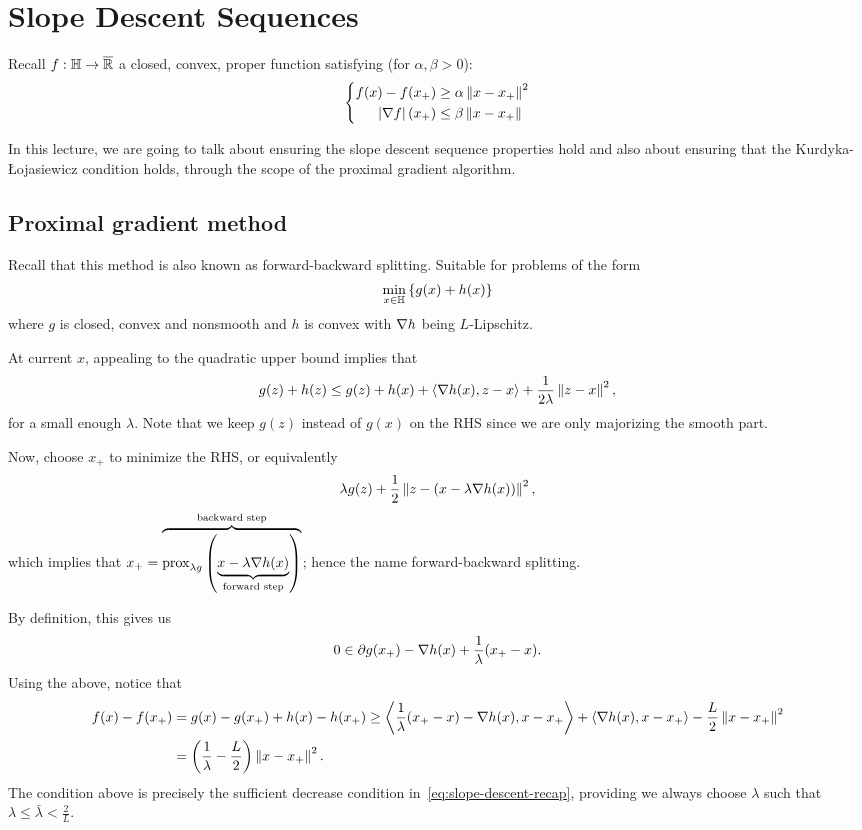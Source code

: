 \section{Slope Descent Sequences}
Recall $f: \mathbb{H} \to \overline{\mathbb{R}}$ a closed, convex, proper function
satisfying (for $\alpha, \beta > 0$):
\begin{align}
	\left\{ \begin{aligned}
	f(x) - f(x_+) &\geq \alpha \left \| x - x_+ \right \|^2 \\
	\left| \nabla f \right|(x_+) &\leq \beta \left \| x - x_+ \right \|
	\end{aligned} \right.
	\label{eq:slope-descent-recap}
\end{align}

In this lecture, we are going to talk about ensuring the slope descent sequence
properties hold and also about ensuring that the Kurdyka-{\L}ojasiewicz
condition holds, through the scope of the proximal gradient algorithm.

\subsection{Proximal gradient method}
Recall that this method is also known as forward-backward splitting. Suitable
for problems of the form
\begin{align}
	\min_{x \in \mathbb{H}} \left\{ g(x) + h(x) \right\}
	\label{eq:prox-grad-prob}
\end{align}
where $g$ is closed, convex and nonsmooth and $h$ is convex with $\nabla h$
being $L$-Lipschitz.

At current $x$, appealing to the quadratic upper bound implies that
\[
	g(z) + h(z) \leq g(z) + h(x) + \left\langle \nabla h(x), z - x \right\rangle
	+ \frac{1}{2 \lambda} \left \| z - x \right \|^2,
\]
for a small enough $\lambda$. Note that we keep $g(z)$ instead of $g(x)$ on the
RHS since we are only majorizing the smooth part.

Now, choose $x_+$ to minimize the RHS, or equivalently
\[
	\lambda g(z) + \frac{1}{2} \left \| z - (x - \lambda \nabla h(x)) \right \|^2,
\]
which implies that $x_+ = \overbrace{\mathrm{prox}_{\lambda g}\left( 
\underbrace{x - \lambda \nabla h(x)}_{\text{forward step}} \right)}^{\text{backward
step}}$; hence the name forward-backward splitting.

By definition, this gives us
\[
	0 \in \partial g(x_+) - \nabla h(x) + \frac{1}{\lambda} (x_+ - x).
\]
Using the above, notice that
\begin{align*}
	f(x) - f(x_+) &= g(x) - g(x_+) + h(x) - h(x_+) \geq
	\left\langle \frac{1}{\lambda} (x_+ - x) - \nabla h(x), x - x_+ \right\rangle
	+ \left\langle \nabla h(x), x - x_+ \right\rangle - \frac{L}{2} \left \| x - x_+ \right \|^2 \\
	&= \left( \frac{1}{\lambda} - \frac{L}{2} \right) \left \| x - x_+ \right \|^2.
\end{align*}
The condition above is precisely the sufficient decrease condition
in~\cref{eq:slope-descent-recap}, providing we always choose $\lambda$ such
that $\lambda \leq \bar{\lambda} < \frac{2}{L}$.

